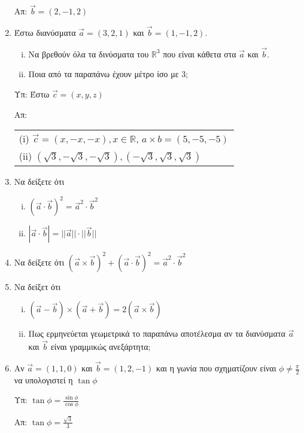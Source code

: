 \begin{enumerate}
		\hfill Απ: $ \vec{b}=(2,-1,2) $

	\item Έστω διανύσματα $ \vec{a}=(3,2,1) $ και $ \vec{b}=(1,-1,2) $.
		\begin{enumerate}[(i)]
			\item Να βρεθούν όλα τα δινύσματα του $ \mathbb{R}^{3} $ που είναι κάθετα στα $ \vec{a} $ και $ \vec{b} $.
			\item Ποια από τα παραπάνω έχουν μέτρο ίσο με $3$; 
		\end{enumerate}

		\hfill Υπ: Έστω $ \vec{c} = (x,y,z) $

		\hfill Απ: \begin{tabular}{l}
			(\textlatin{i}) $ \vec{c} = (x,-x,-x), x\in \mathbb{R}$, $a\times b = (5,-5,-5)$ \\
			(\textlatin{ii}) $ (\sqrt{3}, - \sqrt{3}, - \sqrt{3}), (-\sqrt{3}, \sqrt{3}, \sqrt{3})$ 
		\end{tabular}

	\item Να δείξετε ότι 
		\begin{enumerate}[(i)]
			\item $(\vec{a}\cdot \vec{b})^{2} = \vec{a}^{2}\cdot \vec{b}^{2}$
			\item $|\vec{a}\cdot \vec{b}| = ||\vec{a}|| \cdot ||\vec{b}||$
		\end{enumerate}
		
	\item Να δείξετε ότι $ (\vec{a}\times \vec{b})^{2} + (\vec{a}\cdot \vec{b})^{2} =
		\vec{a}^{2}\cdot \vec{b}^{2} $  

	\item Να δείξετ ότι
		\begin{enumerate}[i)]
			\item $ ( \vec{a} - \vec{b} ) \times ( \vec{a} + \vec{b} ) = 2 (\vec{a} \times \vec{b}) $
			\item Πως ερμηνεύεται γεωμετρικά το παραπάνω αποτέλεσμα αν τα διανύσματα $ \vec{a} $ και $ \vec{b} $ είναι γραμμικώς ανεξάρτητα;
		\end{enumerate}
		
	\item Αν $ \vec{a} = (1,1,0) $ και $ \vec{b} = (1,2,-1) $ και η γωνία που σχηματίζουν είναι $
		\phi\neq \frac{\pi}{2} $ να υπολογιστεί η $ \tan{\phi} $ 

		\hfill Υπ: $ \tan{\phi} = \frac{\sin{\phi}}{\cos{\phi}} $

		\hfill Απ: $ \tan{\phi} = \frac{\sqrt{3}}{3}  $


\end{enumerate}
